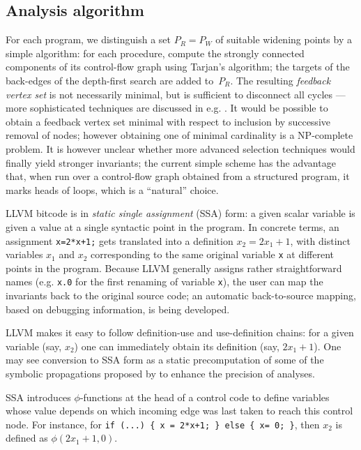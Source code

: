 \documentclass{entcs}
\begin{document}
\subsection{Analysis algorithm}
\label{sec:analysis-algorithm}
For each program, we distinguish a set $P_R = P_W$ of suitable widening points by a simple algorithm: for each procedure, compute the strongly connected components of its control-flow graph using Tarjan's algorithm; the targets of the back-edges of the depth-first search are added to~$P_R$.
The resulting \emph{feedback vertex set} is not necessarily minimal, but is sufficient to disconnect all cycles --- more sophisticated techniques are discussed in e.g. \citet{BourdonclePhd}.
It would be possible to obtain a feedback vertex set minimal with respect to inclusion by successive removal of nodes; however obtaining one of minimal cardinality is a NP-complete problem.
It is however unclear whether more advanced selection techniques would finally yield stronger invariants; the current simple scheme has the advantage that, when run over a control-flow graph obtained from a structured program, it marks heads of loops, which is a ``natural'' choice.

LLVM bitcode is in \emph{static single assignment} (SSA) form: a given scalar variable is given a value at a single syntactic point in the program. In concrete terms, an assignment \lstinline|x=2*x+1;| gets translated into a definition $x_2 = 2x_1+1$, with distinct variables $x_1$ and $x_2$ corresponding to the same original variable \lstinline|x| at different points in the program.
Because LLVM generally assigns rather straightforward names (e.g. \lstinline|x.0| for the first renaming of variable \lstinline|x|), the user can map the invariants back to the original source code; an automatic back-to-source mapping, based on debugging information, is being developed.

LLVM makes it easy to follow definition-use and use-definition chains: for a given variable (say, $x_2$) one can immediately obtain its definition (say, $2x_1+1$).
One may see conversion to SSA form as a static precomputation of some of the symbolic propagations proposed by \citet{DBLP:conf/vmcai/Mine06} to enhance the precision of analyses.

SSA introduces $\phi$-functions at the head of a control code to define variables whose value depends on which incoming edge was last taken to reach this control node. For instance, for \lstinline|if (...) { x = 2*x+1; } else { x= 0; }|, then $x_2$ is defined as $\phi(2x_1+1,0)$.
\end{document}
